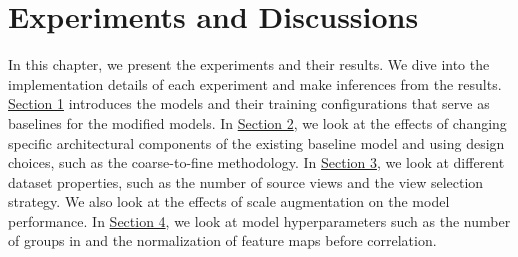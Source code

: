 \chapter{Experiments and Discussions}\label{chap:experiments}

In this chapter, we present the experiments and their results. We dive into the implementation details of each experiment and make inferences from the results. \hyperref[sec:exp-baseline]{Section 1} introduces the models and their training configurations that serve as baselines for the modified models. In \hyperref[sec:exp-arch]{Section 2}, we look at the effects of changing specific architectural components of the existing baseline model and using design choices, such as the coarse-to-fine methodology. In \hyperref[sec:exp-dataset-prop]{Section 3}, we look at different dataset properties, such as the number of source views and the view selection strategy. We also look at the effects of scale augmentation on the model performance. In \hyperref[sec:exp-hyper]{Section 4}, we look at model hyperparameters such as the number of groups in {\gwc} and the normalization of feature maps before correlation. 
